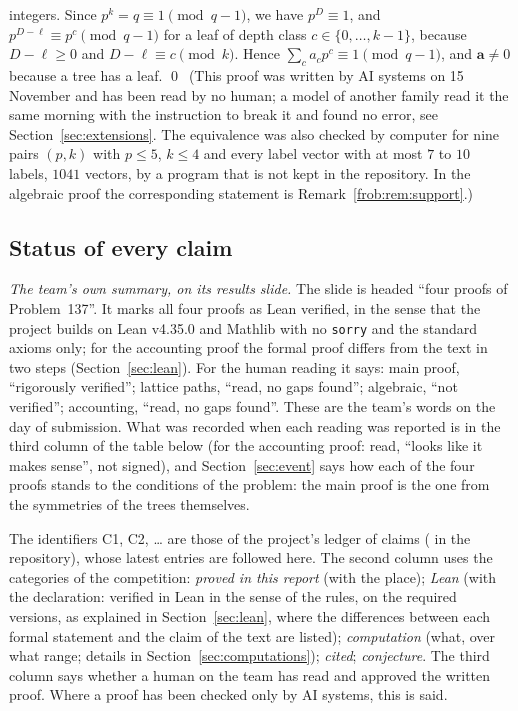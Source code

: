 \documentclass[11pt]{article}
\theoremstyle{definition}
\theoremstyle{remark}
\numberwithin{equation}{section}
\numberwithin{figure}{section}
\begin{document}
integers. Since $p^k=q\equiv1\pmod{q-1}$, we have $p^{D}\equiv1$, and $p^{D-\ell}\equiv p^{c}\pmod{q-1}$ for a
leaf of depth class $c\in\{0,\dots,k-1\}$, because $D-\ell\ge0$ and $D-\ell\equiv c\pmod k$. Hence
$\sum_ca_cp^c\equiv1\pmod{q-1}$, and $\mathbf a\ne0$ because a tree has a leaf. \qed\ (This proof was written by
AI systems on 15 November and has been read by no human; a model of another family read it the same morning
with the instruction to break it and found no error, see Section~\ref{sec:extensions}. The equivalence was also checked by computer for nine
pairs $(p,k)$ with $p\le5$, $k\le4$ and every label vector with at most $7$ to $10$ labels, $1041$ vectors, by
a program that is not kept in the repository. In the algebraic proof the corresponding statement is
Remark~\ref{frob:rem:support}.)

\subsection{Status of every claim}\label{sec:status}
\noindent\emph{The team's own summary, on its results slide.} The slide is headed ``four proofs of
Problem~137''. It marks all four proofs as Lean verified, in the sense that the project builds on Lean v4.35.0
and Mathlib with no \texttt{sorry} and the standard axioms only; for the accounting proof the formal proof
differs from the text in two steps (Section~\ref{sec:lean}). For the human reading it says: main proof,
``rigorously verified''; lattice paths, ``read, no gaps found''; algebraic, ``not verified''; accounting,
``read, no gaps found''. These are the team's words on the day of submission. What was recorded when each
reading was reported is in the third column of the table below (for the accounting proof: read, ``looks like
it makes sense'', not signed), and Section~\ref{sec:event} says how each of the four proofs stands to the
conditions of the problem: the main proof is the one from the symmetries of the trees themselves.

The identifiers C1, C2, \dots{} are those of the project's ledger of claims ( in the
repository), whose latest entries are followed here. The second column uses the categories of the
competition: \emph{proved in this report} (with the place); \emph{Lean} (with the declaration: verified in
Lean in the sense of the rules, on the required versions, as explained in Section~\ref{sec:lean}, where the
differences between each formal statement and the claim of the text are listed);
\emph{computation} (what, over what range; details in Section~\ref{sec:computations}); \emph{cited};
\emph{conjecture}. The third column says whether a human on the team has read and approved the written proof.
Where a proof has been checked only by AI systems, this is said.
\end{document}
